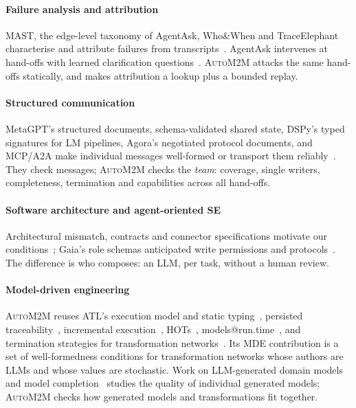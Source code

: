 \documentclass[10pt,a4paper]{article}
\newcommand{\auto}{\textsc{AutoM2M}}
\begin{document}
\paragraph{Failure analysis and attribution} MAST, the edge-level
taxonomy of AgentAsk, Who\&When and TraceElephant characterise and
attribute failures from
transcripts~\cite{cemri2025mast,lin2026agentask,zhang2025whowhen,chen2026traceelephant}.
AgentAsk intervenes at hand-offs with learned clarification
questions~\cite{lin2026agentask}. \auto{} attacks the same hand-offs
statically, and makes attribution a lookup plus a bounded replay.

\paragraph{Structured communication} MetaGPT's structured documents,
schema-validated shared state, DSPy's typed signatures for LM pipelines,
Agora's negotiated protocol documents, and MCP/A2A make individual messages
well-formed or transport them
reliably~\cite{hong2024metagpt,zhang2026patchboard,khattab2024dspy,marro2024agora,mcp2024,a2a2025}.
They check messages; \auto{} checks the \emph{team}: coverage, single
writers, completeness, termination and capabilities across all hand-offs.

\paragraph{Software architecture and agent-oriented SE} Architectural
mismatch, contracts and connector specifications motivate our
conditions~\cite{garlan1995mismatch,garlan2009mismatch,meyer1992dbc,allen1997connection};
Gaia's role schemas anticipated write permissions and
protocols~\cite{wooldridge2000gaia}. The difference is who composes: an
LLM, per task, without a human review.

\paragraph{Model-driven engineering} \auto{} reuses ATL's execution model
and static typing~\cite{jouault2008atl}, persisted
traceability~\cite{jouault2005traceability,vara2014metagem}, incremental
execution~\cite{jouault2010incremental}, HOTs~\cite{tisi2009hot},
models@run.time~\cite{blair2009runtime}, and termination strategies for
transformation networks~\cite{stevens2020networks,klare2023termination}.
Its MDE contribution is a set of well-formedness conditions for
transformation networks whose authors are LLMs and whose values are
stochastic. Work on LLM-generated domain models and model
completion~\cite{chen2023domainmodeling,chaaben2023fewshot,clariso2023mdpe}
studies the quality of individual generated models; \auto{} checks how
generated models and transformations fit together.
\end{document}
